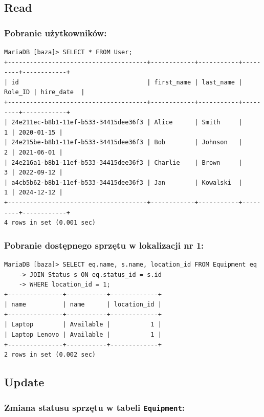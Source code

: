 \documentclass{article}
\begin{document}
\subsection*{Read}

\subsubsection*{Pobranie użytkowników:}

\begin{verbatim}
MariaDB [baza]> SELECT * FROM User;
+--------------------------------------+------------+-----------+---------+------------+
| id                                   | first_name | last_name | Role_ID | hire_date  |
+--------------------------------------+------------+-----------+---------+------------+
| 24e211ec-b8b1-11ef-b533-34415dee36f3 | Alice      | Smith     |       1 | 2020-01-15 |
| 24e215be-b8b1-11ef-b533-34415dee36f3 | Bob        | Johnson   |       2 | 2021-06-01 |
| 24e216a1-b8b1-11ef-b533-34415dee36f3 | Charlie    | Brown     |       3 | 2022-09-12 |
| a4cb5b62-b8b1-11ef-b533-34415dee36f3 | Jan        | Kowalski  |       1 | 2024-12-12 |
+--------------------------------------+------------+-----------+---------+------------+
4 rows in set (0.001 sec)
\end{verbatim}

\subsubsection*{Pobranie dostępnego sprzętu w lokalizacji nr 1:}

\begin{verbatim}
MariaDB [baza]> SELECT eq.name, s.name, location_id FROM Equipment eq
    -> JOIN Status s ON eq.status_id = s.id
    -> WHERE location_id = 1;
+---------------+-----------+-------------+
| name          | name      | location_id |
+---------------+-----------+-------------+
| Laptop        | Available |           1 |
| Laptop Lenovo | Available |           1 |
+---------------+-----------+-------------+
2 rows in set (0.002 sec)
\end{verbatim}

\subsection*{Update}

\subsubsection*{Zmiana statusu sprzętu w tabeli \texttt{Equipment}:}
\end{document}
